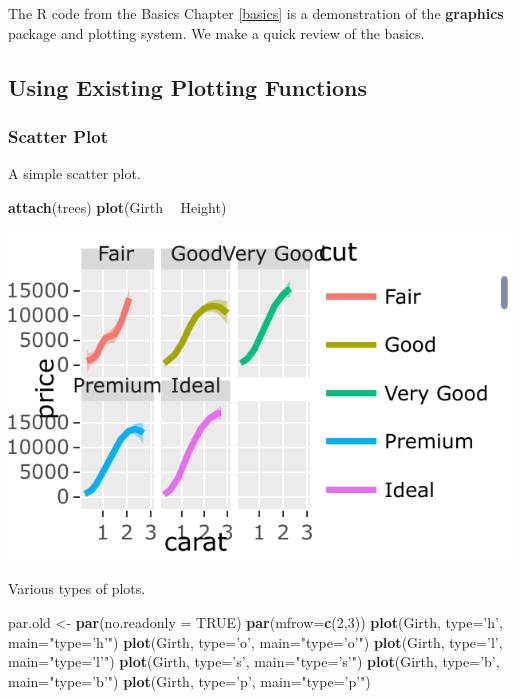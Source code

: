 \documentclass[]{book}
\newenvironment{Shaded}{\begin{snugshade}}{\end{snugshade}}
\newcommand{\DataTypeTok}[1]{\textcolor[rgb]{0.13,0.29,0.53}{#1}}
\newcommand{\DecValTok}[1]{\textcolor[rgb]{0.00,0.00,0.81}{#1}}
\newcommand{\KeywordTok}[1]{\textcolor[rgb]{0.13,0.29,0.53}{\textbf{#1}}}
\newcommand{\NormalTok}[1]{#1}
\newcommand{\OperatorTok}[1]{\textcolor[rgb]{0.81,0.36,0.00}{\textbf{#1}}}
\newcommand{\OtherTok}[1]{\textcolor[rgb]{0.56,0.35,0.01}{#1}}
\newcommand{\StringTok}[1]{\textcolor[rgb]{0.31,0.60,0.02}{#1}}
\theoremstyle{definition}
\theoremstyle{definition}
\theoremstyle{definition}
\theoremstyle{remark}
\begin{document}
The R code from the Basics Chapter \ref{basics} is a demonstration of the \textbf{graphics} package and plotting system.
We make a quick review of the basics.

\hypertarget{using-existing-plotting-functions}{%
\subsection{Using Existing Plotting Functions}\label{using-existing-plotting-functions}}

\hypertarget{scatter-plot}{%
\subsubsection{Scatter Plot}\label{scatter-plot}}

A simple scatter plot.

\begin{Shaded}
\begin{Highlighting}[]
\KeywordTok{attach}\NormalTok{(trees)}
\KeywordTok{plot}\NormalTok{(Girth }\OperatorTok{~}\StringTok{ }\NormalTok{Height)}
\end{Highlighting}
\end{Shaded}

\includegraphics[width=0.5\linewidth]{Rcourse_files/figure-latex/unnamed-chunk-251-1}

Various types of plots.

\begin{Shaded}
\begin{Highlighting}[]
\NormalTok{par.old <-}\StringTok{ }\KeywordTok{par}\NormalTok{(}\DataTypeTok{no.readonly =} \OtherTok{TRUE}\NormalTok{)}
\KeywordTok{par}\NormalTok{(}\DataTypeTok{mfrow=}\KeywordTok{c}\NormalTok{(}\DecValTok{2}\NormalTok{,}\DecValTok{3}\NormalTok{))}
\KeywordTok{plot}\NormalTok{(Girth, }\DataTypeTok{type=}\StringTok{'h'}\NormalTok{, }\DataTypeTok{main=}\StringTok{"type='h'"}\NormalTok{) }
\KeywordTok{plot}\NormalTok{(Girth, }\DataTypeTok{type=}\StringTok{'o'}\NormalTok{, }\DataTypeTok{main=}\StringTok{"type='o'"}\NormalTok{) }
\KeywordTok{plot}\NormalTok{(Girth, }\DataTypeTok{type=}\StringTok{'l'}\NormalTok{, }\DataTypeTok{main=}\StringTok{"type='l'"}\NormalTok{)}
\KeywordTok{plot}\NormalTok{(Girth, }\DataTypeTok{type=}\StringTok{'s'}\NormalTok{, }\DataTypeTok{main=}\StringTok{"type='s'"}\NormalTok{)}
\KeywordTok{plot}\NormalTok{(Girth, }\DataTypeTok{type=}\StringTok{'b'}\NormalTok{, }\DataTypeTok{main=}\StringTok{"type='b'"}\NormalTok{)}
\KeywordTok{plot}\NormalTok{(Girth, }\DataTypeTok{type=}\StringTok{'p'}\NormalTok{, }\DataTypeTok{main=}\StringTok{"type='p'"}\NormalTok{)}
\end{Highlighting}
\end{Shaded}
\end{document}
